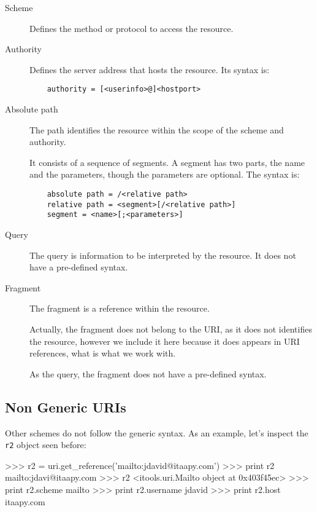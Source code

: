 \begin{description}
  \item [Scheme] Defines the method or protocol to access the resource.

  \item [Authority] Defines the server address that hosts the resource.
    Its syntax is:

\begin{verbatim}
    authority = [<userinfo>@]<hostport>
\end{verbatim}

  \item [Absolute path] The path identifies the resource within the scope
    of the scheme and authority.

    It consists of a sequence of segments. A segment has two parts, the
    name and the parameters, though the parameters are optional. The syntax is:

\begin{verbatim}
    absolute path = /<relative path>
    relative path = <segment>[/<relative path>]
    segment = <name>[;<parameters>]
\end{verbatim}

  \item [Query] The query is information to be interpreted by the resource.
    It does not have a pre-defined syntax.

  \item [Fragment] The fragment is a reference within the resource.

    Actually, the fragment does not belong to the URI, as it does not
    identifies the resource, however we include it here because it does
    appears in URI references, what is what we work with.

    As the query, the fragment does not have a pre-defined syntax.
\end{description}


\subsection{Non Generic URIs}

Other schemes do not follow the generic syntax. As an example, let's inspect
the {\tt r2} object seen before:

\begin{code}
    >>> r2 = uri.get_reference('mailto:jdavid@itaapy.com')
    >>> print r2
    mailto:jdavi@itaapy.com
    >>> r2
    <itools.uri.Mailto object at 0x403f45ec>
    >>> print r2.scheme
    mailto
    >>> print r2.username
    jdavid
    >>> print r2.host    
    itaapy.com
\end{code}

